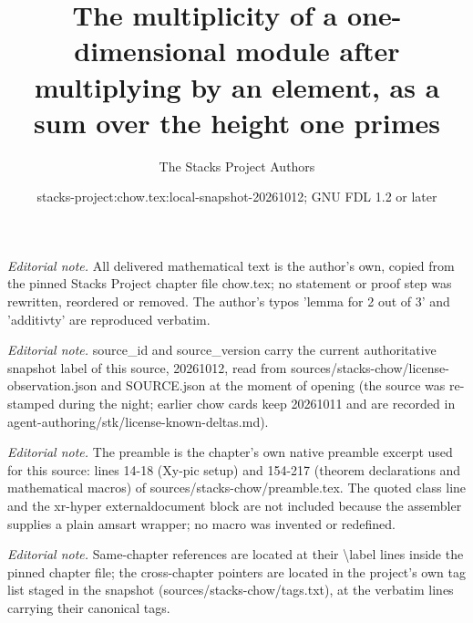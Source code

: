 \documentclass[10pt,a4paper]{amsart}
\title{The multiplicity of a one-dimensional module after multiplying by an element, as a sum over the height one primes}
\author{The Stacks Project Authors}
\date{stacks-project:chow.tex:local-snapshot-20261012; GNU FDL 1.2 or later}
\theoremstyle{plain}
\theoremstyle{definition}
\theoremstyle{remark}
\numberwithin{equation}{subsection}
\begin{document}
\maketitle
\noindent\textit{Editorial note.} All delivered mathematical text is the author's own, copied from the pinned Stacks Project chapter file chow.tex; no statement or proof step was rewritten, reordered or removed. The author's typos 'lemma for 2 out of 3' and 'additivty' are reproduced verbatim.\par\medskip
\noindent\textit{Editorial note.} source\_id and source\_version carry the current authoritative snapshot label of this source, 20261012, read from sources/stacks-chow/license-observation.json and SOURCE.json at the moment of opening (the source was re-stamped during the night; earlier chow cards keep 20261011 and are recorded in agent-authoring/stk/license-known-deltas.md).\par\medskip
\noindent\textit{Editorial note.} The preamble is the chapter's own native preamble excerpt used for this source: lines 14-18 (Xy-pic setup) and 154-217 (theorem declarations and mathematical macros) of sources/stacks-chow/preamble.tex. The quoted class line and the xr-hyper externaldocument block are not included because the assembler supplies a plain amsart wrapper; no macro was invented or redefined.\par\medskip
\noindent\textit{Editorial note.} Same-chapter references are located at their \textbackslash{}label lines inside the pinned chapter file; the cross-chapter pointers are located in the project's own tag list staged in the snapshot (sources/stacks-chow/tags.txt), at the verbatim lines carrying their canonical tags.\par\medskip
\end{document}
